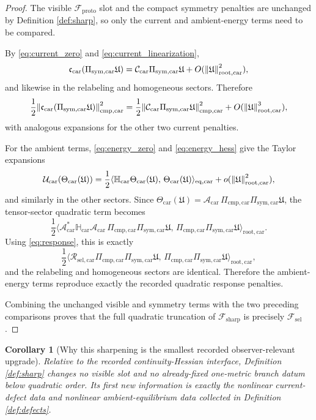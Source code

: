 \documentclass[11pt]{article}
\newcommand{\ProtoFunctional}{\mathscr F_{\mathrm{proto}}}
\newcommand{\StemFunctional}{\mathscr F_{\mathrm{sel}}}
\newcommand{\SharpFunctional}{\mathscr F_{\mathrm{sharp}}}
\newcommand{\RootTensor}{\mathfrak U}
\newcommand{\TensorSymProj}{\Pi_{\mathrm{sym,car}}}
\newcommand{\TensorCompat}{\mathcal C_{\mathrm{car}}}
\newcommand{\TensorCmpProj}{\Pi_{\mathrm{cmp,car}}}
\newcommand{\TensorCurrent}{\mathfrak c_{\mathrm{car}}}
\newcommand{\TensorResp}{\mathcal R_{\mathrm{sel,car}}}
\newcommand{\TensorEqRead}{\mathcal A_{\mathrm{car}}}
\newcommand{\TensorAmbientHess}{\mathbb H_{\mathrm{car}}}
\newcommand{\TensorAmbientEnergy}{\mathcal U_{\mathrm{car}}}
\newcommand{\TensorTheta}{\Theta_{\mathrm{car}}}
\newtheorem{corollary}{Corollary}
\begin{document}
\begin{proof}
The visible \(\ProtoFunctional\) slot and the compact symmetry penalties are unchanged by Definition \ref{def:sharp}, so only the current and ambient-energy terms need to be compared.

By \eqref{eq:current_zero} and \eqref{eq:current_linearization},
\[
\TensorCurrent(\TensorSymProj\RootTensor)
=
\TensorCompat\TensorSymProj\RootTensor
+O(\norm{\RootTensor}_{\mathrm{root,car}}^2),
\]
and likewise in the relabeling and homogeneous sectors. Therefore
\[
\frac12\norm{\TensorCurrent(\TensorSymProj\RootTensor)}_{\mathrm{cmp,car}}^2
=
\frac12\norm{\TensorCompat\TensorSymProj\RootTensor}_{\mathrm{cmp,car}}^2
+O(\norm{\RootTensor}_{\mathrm{root,car}}^3),
\]
with analogous expansions for the other two current penalties.

For the ambient terms, \eqref{eq:energy_zero} and \eqref{eq:energy_hess} give the Taylor expansions
\[
\TensorAmbientEnergy(\TensorTheta(\RootTensor))
=
\frac12\langle \TensorAmbientHess\TensorTheta(\RootTensor),\,
\TensorTheta(\RootTensor)\rangle_{\mathrm{eq,car}}
+o(\norm{\RootTensor}_{\mathrm{root,car}}^2),
\]
and similarly in the other sectors. Since \(\TensorTheta(\RootTensor)=\TensorEqRead\,\TensorCmpProj\TensorSymProj\RootTensor\), the tensor-sector quadratic term becomes
\[
\frac12\langle \TensorEqRead^*\TensorAmbientHess\TensorEqRead\,
\TensorCmpProj\TensorSymProj\RootTensor,\,
\TensorCmpProj\TensorSymProj\RootTensor\rangle_{\mathrm{root,car}}.
\]
Using \eqref{eq:response}, this is exactly
\[
\frac12\langle \TensorResp\TensorCmpProj\TensorSymProj\RootTensor,\,
\TensorCmpProj\TensorSymProj\RootTensor\rangle_{\mathrm{root,car}},
\]
and the relabeling and homogeneous sectors are identical. Therefore the ambient-energy terms reproduce exactly the recorded quadratic response penalties.

Combining the unchanged visible and symmetry terms with the two preceding comparisons proves that the full quadratic truncation of \(\SharpFunctional\) is precisely \(\StemFunctional\).
\end{proof}

\begin{corollary}[Why this sharpening is the smallest recorded observer-relevant upgrade]
\label{cor:smallest}
Relative to the recorded continuity-Hessian interface, Definition \ref{def:sharp} changes no visible slot and no already-fixed one-metric branch datum below quadratic order. Its first new information is exactly the nonlinear current-defect data and nonlinear ambient-equilibrium data collected in Definition \ref{def:defects}.
\end{corollary}
\end{document}
